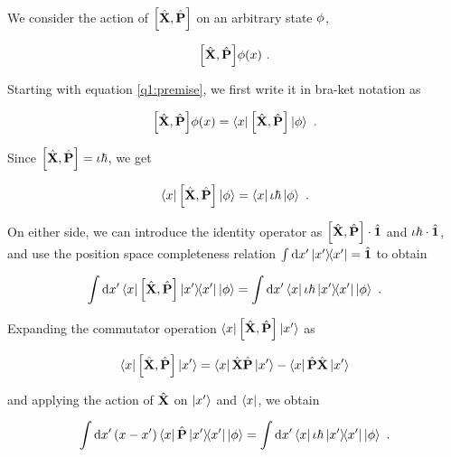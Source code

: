 We consider the action of $\commutator{\Position}{\Momentum}$ 
on an arbitrary state $\phi$, 

\begin{equation}
    \commutator{\Position}{\Momentum} \statephi(\position)~.
    \label{q1:premise}
\end{equation}

Starting with equation \ref{q1:premise}, we first write it in
bra-ket notation as

\begin{equation}
    \commutator{\Position}{\Momentum} \statephi(\position) = 
        \bra{\position} \commutator{\Position}{\Momentum} \ket{\statephi}~.
\end{equation}

Since $\commutator{\Position}{\Momentum} = \iota \hbar$, we get

\begin{equation}
    \bra{\position} \commutator{\Position}{\Momentum} \ket{\statephi} =
        \bra{\position} \iota \hbar \ket{\statephi}~.
\end{equation}

On either side, we can introduce the identity operator as 
$\commutator{\Position}{\Momentum} \cdot \Identity$ and 
$\iota \hbar \cdot \hat{\textbf{1}}$, and use the 
position space completeness relation $\int 
\dd{x'} \ketbra{x'}{x'} = \hat{\textbf{1}}$ to obtain

\begin{equation}
    \int \dd{\position'} \bra{\position}\commutator{\Position}{\Momentum}
    \ketbra{\position'}{\position'}\ket{\statephi} =
    \int \dd{\position'} \bra{\position}\iota \hbar
    \ketbra{\position'}{\position'}\ket{\statephi}~.
\end{equation}

Expanding the commutator operation $\bra{\position}
\commutator{\Position}{\Momentum}\ket{\position'}$ as

\begin{equation}
    \bra{\position}\commutator{\Position}{\Momentum}\ket{\position'}
    = \bra{\position}\Position\Momentum\ket{\position'} - 
        \bra{\position}\Momentum\Position\ket{\position'} 
    \nonumber
\end{equation}

and applying the action of $\hat{\textbf{X}}$ on $\ket{x'}$
and $\bra{x}$, we obtain

\begin{equation}
    \int \dd{x'} (x - x')\bra{x}\hat{\textbf{P}}
    \ketbra{x'}{x'}\ket{\phi} =
    \int \dd{x'} \bra{x}\iota \hbar
    \ketbra{x'}{x'}\ket{\phi}~.
\end{equation}

